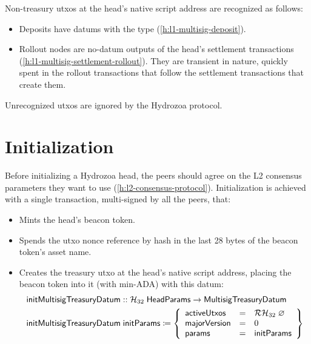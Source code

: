 \documentclass[../hydrozoa.tex]{subfiles}
\begin{document}
Non-treasury utxos at the head's native script address are recognized as follows:
\begin{itemize}
  \item Deposits have datums with the  type (\cref{h:l1-multisig-deposit}).
  \item Rollout nodes are no-datum outputs of the head's settlement transactions (\cref{h:l1-multisig-settlement-rollout}).
    They are transient in nature, quickly spent in the rollout transactions that follow the settlement transactions that create them.
\end{itemize}

Unrecognized utxos are ignored by the Hydrozoa protocol.

\section{Initialization}%
\label{h:l1-multisig-initialization}%

Before initializing a Hydrozoa head, the peers should agree on the L2 consensus parameters they want to use (\cref{h:l2-consensus-protocol}).
Initialization is achieved with a single transaction, multi-signed by all the peers, that:
\begin{itemize}
  \item Mints the head's beacon token.
  \item Spends the utxo nonce reference by hash in the last 28 bytes of the beacon token's asset name.
  \item Creates the treasury utxo at the head's native script address, placing the beacon token into it (with min-ADA) with this datum:
    \begin{equation*}
    \begin{split}
      \mathsf{initMultisigTreasuryDatum} &:: \mathcal{H}_{32} \; \mathsf{HeadParams} -> \mathsf{MultisigTreasuryDatum} \\
      \mathsf{initMultisigTreasuryDatum} &\; \mathsf{initParams} \coloneq \left\{
        \begin{array}{lll}
          \mathsf{activeUtxos} &=& \mathcal{RH}_{32} \; \varnothing \\
          \mathsf{majorVersion} &=& 0 \\
          \mathsf{params} &=& \mathsf{initParams}
        \end{array}\right\}
    \end{split}
    \end{equation*}
\end{itemize}
\end{document}
